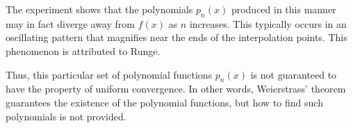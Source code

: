 The experiment shows that  the polynomials $p_n(x)$ produced in this manner may in fact diverge away from $f(x)$ as $n$ increases. This typically occurs in an oscillating pattern that magnifies near the ends of the interpolation points. This phenomenon is attributed to Runge.

Thus, this particular set of polynomial functions $p_n(x)$ is not guaranteed to have the property of uniform convergence. In other words, Weierstrass' theorem guarantees the existence of the polynomial functions, but how to find such polynomials is not provided.
